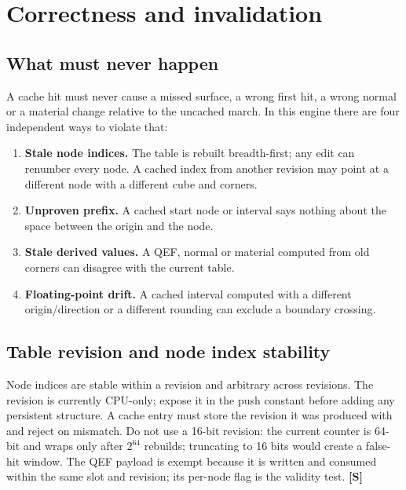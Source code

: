 \documentclass[11pt,a4paper]{article}
\newcommand{\evS}{\textsf{\textbf{\color{evS}[S]}}}
\theoremstyle{plain}
\theoremstyle{definition}
\theoremstyle{remark}
\begin{document}
\section{Correctness and invalidation}
\label{sec:correctness}

\subsection{What must never happen}

A cache hit must never cause a missed surface, a wrong first hit, a wrong
normal or a material change relative to the uncached march. In this engine
there are four independent ways to violate that:

\begin{enumerate}[leftmargin=1.4em,itemsep=1pt]
\item \textbf{Stale node indices.} The table is rebuilt breadth-first; any edit
      can renumber every node. A cached index from another revision may point
      at a different node with a different cube and corners.
\item \textbf{Unproven prefix.} A cached start node or interval says nothing
      about the space between the origin and the node.
\item \textbf{Stale derived values.} A QEF, normal or material computed from
      old corners can disagree with the current table.
\item \textbf{Floating-point drift.} A cached interval computed with a
      different origin/direction or a different rounding can exclude a
      boundary crossing.
\end{enumerate}

\subsection{Table revision and node index stability}

Node indices are stable within a revision and arbitrary across revisions. The
revision is currently CPU-only; expose it in the push constant before adding
any persistent structure. A cache entry must store the revision it was
produced with and reject on mismatch. Do not use a 16-bit revision: the
current counter is 64-bit and wraps only after $2^{64}$ rebuilds; truncating to
16 bits would create a false-hit window. The QEF payload is exempt because it
is written and consumed within the same slot and revision; its per-node flag
is the validity test. \evS
\end{document}
